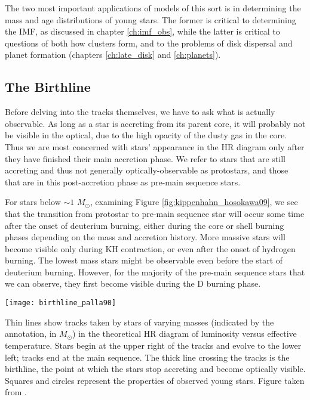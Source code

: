 The two most important applications of models of this sort is in determining the mass and age distributions of young stars. The former is critical to determining the IMF, as discussed in chapter \ref{ch:imf_obs}, while the latter is critical to questions of both how clusters form, and to the problems of disk dispersal and planet formation (chapters \ref{ch:late_disk} and \ref{ch:planets}).

\subsection{The Birthline}

Before delving into the tracks themselves, we have to ask what is actually observable. As long as a star is accreting from its parent core, it will probably not be visible in the optical, due to the high opacity of the dusty gas in the core. Thus we are most concerned with stars' appearance in the HR diagram only after they have finished their main accretion phase. We refer to stars that are still accreting and thus not generally optically-observable as protostars, and those that are in this post-accretion phase as pre-main sequence stars. 

For stars below $\sim 1$ $M_\odot$, examining Figure \ref{fig:kippenhahn_hosokawa09}, we see that the transition from protostar to pre-main sequence star will occur some time after the onset of deuterium burning, either during the core or shell burning phases depending on the mass and accretion history. More massive stars will become visible only during KH contraction, or even after the onset of hydrogen burning. The lowest mass stars might be observable even before the start of deuterium burning. However, for the majority of the pre-main sequence stars that we can observe, they first become visible during the D burning phase.

\begin{marginfigure}
\texttt{[image: birthline\_palla90]}
\caption[The protostellar birthline]{
\label{fig:birthline_palla90}
Thin lines show tracks taken by stars of varying masses (indicated by the annotation, in $M_\odot$) in the theoretical HR diagram of luminosity versus effective temperature. Stars begin at the upper right of the tracks and evolve to the lower left; tracks end at the main sequence. The thick line crossing the tracks is the birthline, the point at which the stars stop accreting and become optically visible. Squares and circles represent the properties of observed young stars. Figure taken from \citet{palla90a}.
}
\end{marginfigure}

